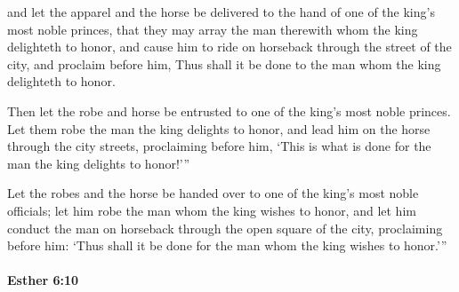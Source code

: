			\begin{versebox}
					\item[BHS] 
					\item[LXX] 
					\item[ASV] and let the apparel and the horse be delivered to the hand of one of the king's most noble princes, that they may array the man therewith whom the king delighteth to honor, and cause him to ride on horseback through the street of the city, and proclaim before him, Thus shall it be done to the man whom the king delighteth to honor.
					\item[NIV] Then let the robe and horse be entrusted to one of the king’s most noble princes. Let them robe the man the king delights to honor, and lead him on the horse through the city streets, proclaiming before him, ‘This is what is done for the man the king delights to honor!’”
					\item[NRSV] Let the robes and the horse be handed over to one of the king’s most noble officials; let him robe the man whom the king wishes to honor, and let him conduct the man on horseback through the open square of the city, proclaiming before him: ‘Thus shall it be done for the man whom the king wishes to honor.’”
			\end{versebox}

		\paragraph{Esther 6:10} %
			\label{ESTHER-6-10}

